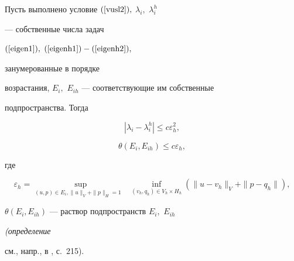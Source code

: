 \begin{thm}


Пусть выполнено условие $(\ref{vusl2}),$ $ \lambda_i,$ $\lambda_i^h $


--- собственные числа задач 


$(\ref{eigen1}),$ $(\ref{eigenh1})- (\ref{eigenh2}),$


занумерованные в порядке 


возрастания, $E_i,$ $ E_{ih} $ --- соответствующие им собственные 


подпространства. Тогда 


$$


| \lambda_i - \lambda_i^h | \le c \varepsilon_h^2,


$$


$$


\theta (E_i, E_{ih}) \le c \varepsilon_h,


$$


где


$$


\varepsilon_h = \sup \limits_ {(u, p) \in E_i, 


\|u\|_V + \|p \|_H =1 \quad } 


\inf_ {(v_h, q_h) \in V_h \times H_h} ( \| u - v_h \|_V + 


 \| p - q_h\|),


$$


$ \theta (E_i, E_{ih}) $ --- раствор подпространств $E_i,$ $E_{ih} $


{\em (определение


см., напр., в \cite{Dya}, с.~215).}


\end{thm} 





\bigskip 


